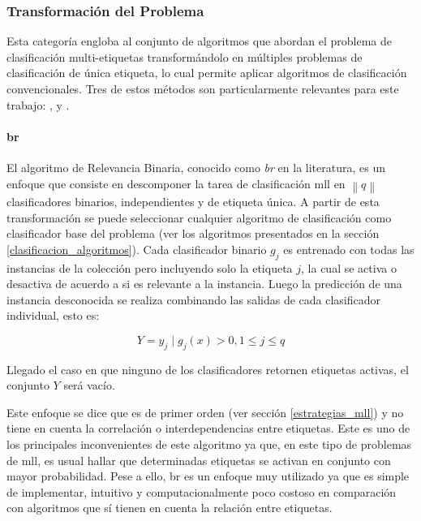 \subsubsection{Transformación del Problema} 

Esta categoría engloba al conjunto de algoritmos que abordan el problema de
clasificación multi-etiquetas transformándolo en múltiples problemas de
clasificación de única etiqueta, lo cual permite aplicar algoritmos de
clasificación convencionales. Tres de estos métodos son particularmente
relevantes para este trabajo: ,  y
.

\paragraph{\acrfull{br}}

El algoritmo de Relevancia Binaria, conocido como \textit{\acrlong{br}} en la
literatura, es un enfoque que consiste en descomponer la tarea de clasificación
\acrshort{mll} en $\left\|q\right\|$ clasificadores binarios, independientes y
de etiqueta única.  A partir de esta transformación se puede seleccionar
cualquier algoritmo de clasificación como clasificador base del problema (ver
los algoritmos presentados en la sección \ref{clasificacion_algoritmos}).  Cada
clasificador binario $g_{j}$ es entrenado con todas las instancias de la
colección pero incluyendo solo la etiqueta $j$, la cual se activa o desactiva de
acuerdo a si es relevante a la instancia. Luego la predicción de una instancia
desconocida se realiza combinando las salidas de cada clasificador individual,
esto es: 

\begin{equation}
   Y = {y_{j} \mid g_{j}(x) > 0, 1 \leq j \leq q}
\end{equation}
 
Llegado el caso en que ninguno de los clasificadores retornen etiquetas activas,
el conjunto $Y$ será vacío.

Este enfoque se dice que es de primer orden (ver sección \ref{estrategias_mll})
y no tiene en cuenta la correlación o interdependencias entre etiquetas. Este es
uno de los principales inconvenientes de este algoritmo ya que, en este tipo de
problemas de \acrshort{mll}, es usual hallar que determinadas etiquetas se
activan en conjunto con mayor probabilidad. Pese a ello, \acrshort{br} es un
enfoque muy utilizado \cite{zhang_review_2014} ya que es simple de implementar,
intuitivo y computacionalmente poco costoso en comparación con algoritmos que sí
tienen en cuenta la relación entre etiquetas.  


